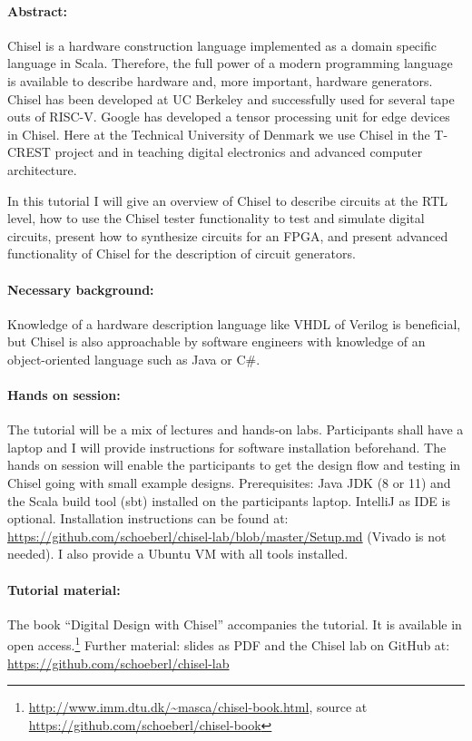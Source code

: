 \documentclass{article}
\begin{document}
\paragraph{Abstract:}

Chisel is a hardware construction language implemented as a domain specific language in Scala. Therefore, the full power of a modern programming language is available to describe hardware and, more important, hardware generators. Chisel has been developed at UC Berkeley and successfully used for several tape outs of RISC-V. Google has developed a tensor processing unit for edge devices in Chisel. Here at the Technical University of Denmark we use Chisel in the T-CREST project and in teaching digital electronics and advanced computer architecture.

In this tutorial I will give an overview of Chisel to describe circuits at the RTL level, how to use the Chisel tester functionality to test and simulate digital circuits, present how to synthesize circuits for an FPGA, and present advanced functionality of Chisel for the description of circuit generators.

 \paragraph{Necessary background:}

Knowledge of a hardware description language like VHDL of Verilog is beneficial, but Chisel is also
approachable by software engineers with knowledge of an object-oriented language such as Java or C\#.


 \paragraph{Hands on session:}
 The tutorial will be a mix of lectures and hands-on labs. Participants shall have a laptop and I will provide
instructions for software installation beforehand.
 The hands on session will enable the participants to get the design
 flow and testing in Chisel going with small example designs.
 Prerequisites: Java JDK (8 or 11) and the Scala build tool (sbt) installed on the participants laptop.
 IntelliJ as IDE is optional. Installation instructions can be found
at: \url{https://github.com/schoeberl/chisel-lab/blob/master/Setup.md} (Vivado is not needed).
I also provide a Ubuntu VM with all tools installed.

 \paragraph{Tutorial material:}
The book ``Digital Design with Chisel'' accompanies the tutorial.
It is available in open access.\footnote{\url{http://www.imm.dtu.dk/~masca/chisel-book.html}, source at \url{https://github.com/schoeberl/chisel-book}}
Further material: slides as PDF and the Chisel lab on GitHub at: \url{https://github.com/schoeberl/chisel-lab}
\end{document}

